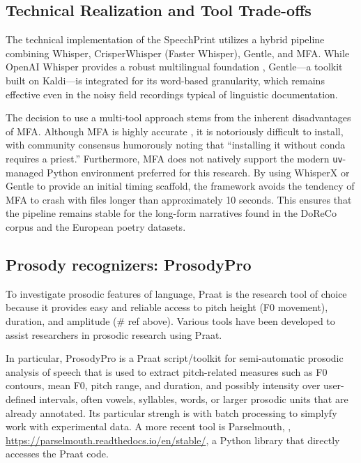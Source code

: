 \subsection{Technical Realization and Tool Trade-offs}

The technical implementation of the SpeechPrint utilizes a hybrid pipeline combining Whisper, CrisperWhisper (Faster Whisper), Gentle, and MFA. While OpenAI Whisper provides a robust multilingual foundation \cite{radford2023whisper}, Gentle---a toolkit built on Kaldi---is integrated for its word-based granularity, which remains effective even in the noisy field recordings typical of linguistic documentation.

The decision to use a multi-tool approach stems from the inherent disadvantages of MFA. Although MFA is highly accurate \cite{mcauliffe2017mfa}, it is notoriously difficult to install, with community consensus humorously noting that ``installing it without conda requires a priest.'' Furthermore, MFA does not natively support the modern \texttt{uv}-managed Python environment preferred for this research. By using WhisperX \cite{bain2023whisperx} or Gentle to provide an initial timing scaffold, the framework avoids the tendency of MFA to crash with files longer than approximately 10 seconds. This ensures that the pipeline remains stable for the long-form narratives found in the DoReCo corpus and the European poetry datasets.

\subsection{Prosody recognizers: ProsodyPro}

To investigate prosodic features of language, Praat is the research tool of choice because it provides easy and reliable access to pitch height (F0 movement), duration, and amplitude (# ref above). Various tools have been developed to assist researchers in prosodic research using Praat. 

In particular, ProsodyPro \cite{xu2013prosodypro} is a Praat script/toolkit for semi-automatic prosodic analysis of speech that is used to extract pitch-related measures such as F0 contours, mean F0, pitch range, and duration, and possibly intensity over user-defined intervals, often vowels, syllables, words, or larger prosodic units that are already annotated. Its particular strengh is with batch processing to simplyfy work with experimental data. A more recent tool is Parselmouth, \cite{Jadoul2018},  \url{https://parselmouth.readthedocs.io/en/stable/}, a Python library that directly accesses the Praat code. 

